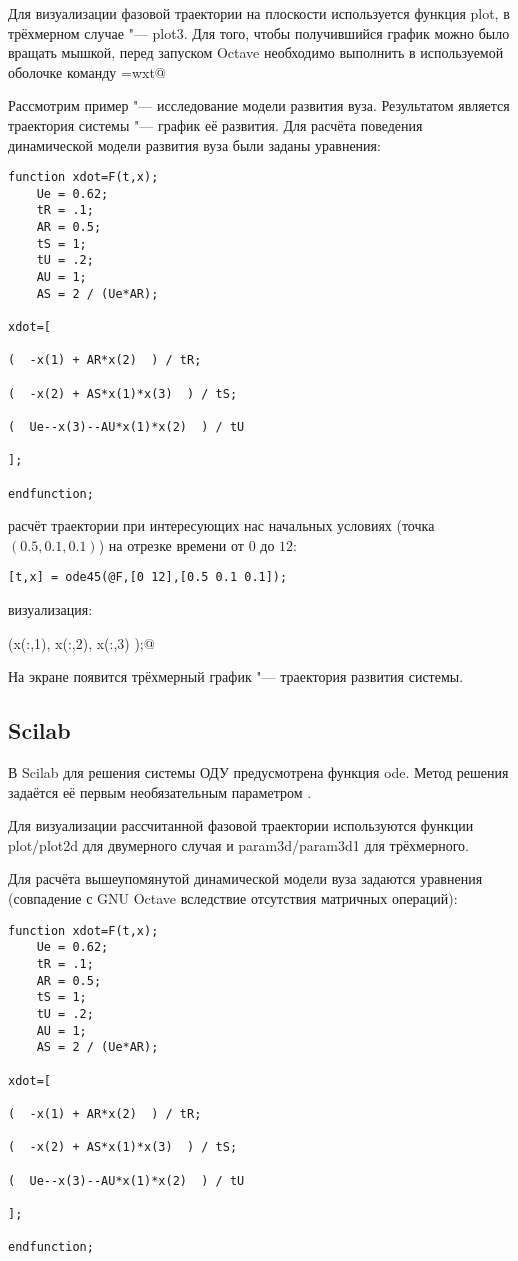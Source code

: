 \documentclass[10pt, a5paper]{article}
\begin{document}
Для визуализации фазовой траектории на плоскости используется функция plot, в трёхмерном случае "--- plot3. Для того, чтобы получившийся график можно было вращать мышкой, перед запуском Octave необходимо выполнить в используемой оболочке команду \verb@GNUTERM=wxt@

Рассмотрим пример "--- исследование модели развития вуза. Результатом является траектория системы "--- график её развития.
Для расчёта поведения динамической модели развития вуза \cite{Kon2} были заданы уравнения:
\begin{verbatim}
function xdot=F(t,x);
    Ue = 0.62;
    tR = .1;
    AR = 0.5;
    tS = 1;
    tU = .2;
    AU = 1;
    AS = 2 / (Ue*AR);

xdot=[

(  -x(1) + AR*x(2)  ) / tR;

(  -x(2) + AS*x(1)*x(3)  ) / tS;

(  Ue--x(3)--AU*x(1)*x(2)  ) / tU

];

endfunction;
\end{verbatim}
расчёт траектории при интересующих нас начальных условиях (точка $(0.5, 0.1, 0.1)$) на отрезке времени от $0$ до $12$:

\verb![t,x] = ode45(@F,[0 12],[0.5 0.1 0.1]);!

визуализация:

(x(:,1), x(:,2), x(:,3) );@

На экране появится трёхмерный график "--- траектория развития системы.

\subsection*{Scilab}

В Scilab для решения системы ОДУ предусмотрена функция ode. Метод решения задаётся её первым необязательным параметром \cite{Kon3}.

Для визуализации рассчитанной фазовой траектории используются функции plot/plot2d для двумерного случая и param3d/param3d1 для трёхмерного.

Для расчёта вышеупомянутой динамической модели вуза задаются уравнения (совпадение с GNU Octave вследствие отсутствия матричных операций):
\begin{verbatim}
function xdot=F(t,x);
    Ue = 0.62;
    tR = .1;
    AR = 0.5;
    tS = 1;
    tU = .2;
    AU = 1;
    AS = 2 / (Ue*AR);

xdot=[

(  -x(1) + AR*x(2)  ) / tR;

(  -x(2) + AS*x(1)*x(3)  ) / tS;

(  Ue--x(3)--AU*x(1)*x(2)  ) / tU

];

endfunction;
\end{verbatim}
\end{document}
